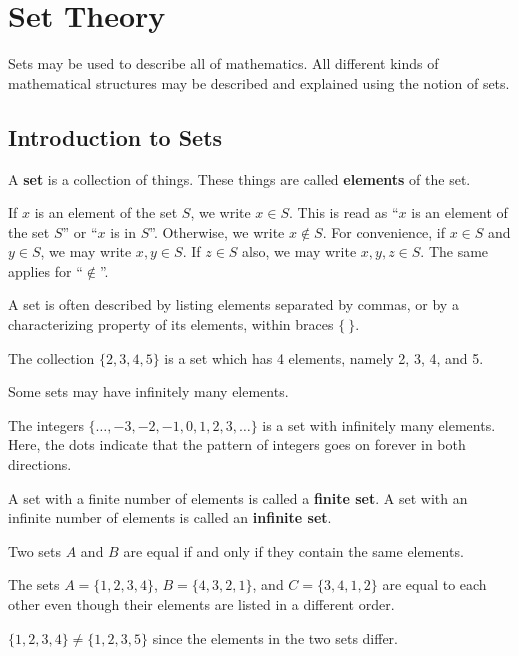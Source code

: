 
\frontmatterpages

\chapter{Set Theory}
Sets may be used to describe all of mathematics. All different kinds of mathematical structures may be described and explained using the notion of sets.

\section{Introduction to Sets}
\begin{definition}
    A \textbf{set} is a collection of things. These things are called \textbf{elements} of the set.
\end{definition}
If $x$ is an element of the set $S$, we write $x \in S$. This is read as ``$x$ is an element of the set $S$'' or ``$x$ is in $S$''. Otherwise, we write $x \notin S$. For convenience, if $x \in S$ and $y \in S$, we may write $x, y \in S$. If $z \in S$ also, we may write $x, y, z \in S$. The same applies for ``$\notin$''.

A set is often described by listing elements separated by commas, or by a characterizing property of its elements, within braces $\{ \ \}$. 
\begin{example}
    The collection $\{2, 3, 4, 5\}$ is a set which has 4 elements, namely 2, 3, 4, and 5.
\end{example}
Some sets may have infinitely many elements.
\begin{example}
    The integers $\{\dots, -3, -2, -1, 0, 1, 2, 3, \dots\}$ is a set with infinitely many elements. Here, the dots indicate that the pattern of integers goes on forever in both directions.
\end{example}

\begin{definition}
    A set with a finite number of elements is called a \textbf{finite set}. A set with an infinite number of elements is called an \textbf{infinite set}.
\end{definition}

\begin{definition}
    Two sets $A$ and $B$ are equal if and only if they contain the same elements.
\end{definition}
\begin{example}
    The sets $A = \{1, 2, 3, 4\}$, $B = \{4, 3, 2, 1\}$, and $C = \{3, 4, 1, 2\}$ are equal to each other even though their elements are listed in a different order.
\end{example}
\begin{example}
    $\{1, 2, 3, 4\} \neq \{1, 2, 3, 5\}$ since the elements in the two sets differ.
\end{example}

